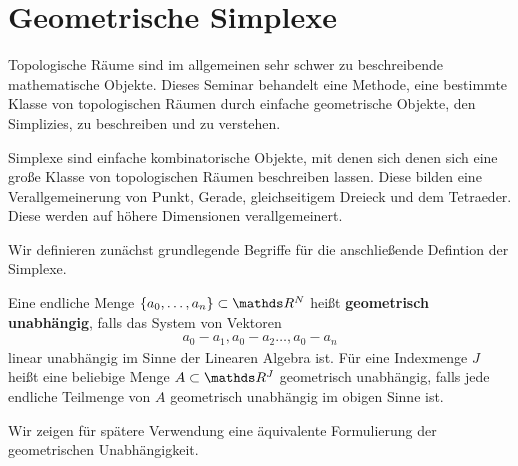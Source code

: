 





\section{Geometrische Simplexe}


Topologische Räume sind im allgemeinen sehr schwer zu beschreibende
mathematische Objekte. Dieses Seminar behandelt eine Methode, eine
bestimmte Klasse von topologischen Räumen durch einfache geometrische
Objekte, den Simplizies, zu beschreiben und zu verstehen.

Simplexe sind einfache kombinatorische Objekte, mit denen sich denen
sich eine große Klasse von topologischen Räumen beschreiben lassen.
Diese bilden eine Verallgemeinerung von Punkt, Gerade, gleichseitigem Dreieck
und dem Tetraeder. Diese werden auf höhere Dimensionen verallgemeinert.

Wir definieren zunächst grundlegende Begriffe für die anschließende
Defintion der Simplexe.

\begin{Def}
  \label{def:1}
  Eine endliche Menge $\{ a_0,\ldots ,a_n \} \subset \R^N$ heißt
  \textbf{geometrisch unabhängig}, falls das System von Vektoren
  \begin{gather*}
    a_0 - a_1 , a_0 - a_2 \ldots , a_0 - a_n
  \end{gather*}
  linear unabhängig im Sinne der Linearen Algebra ist. Für eine
  Indexmenge $J$ heißt eine beliebige Menge $A \subset \R^J$
  geometrisch unabhängig, falls jede endliche Teilmenge von $A$
  geometrisch unabhängig im obigen Sinne ist.
\end{Def}
Wir zeigen für spätere Verwendung eine äquivalente Formulierung der
geometrischen Unabhängigkeit.

